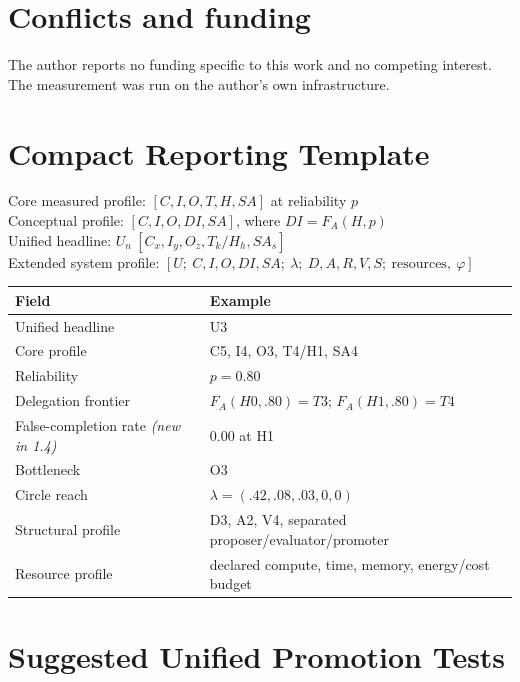 \documentclass[11pt]{article}
\theoremstyle{definition}
\newcommand{\FA}{\ensuremath{F_A(H,p)}}
\begin{document}
\section*{Conflicts and funding}

The author reports no funding specific to this work and no competing interest. The measurement was run on the author's own infrastructure.




\appendix

\section{Compact Reporting Template}

\begin{center}
Core measured profile: $[C, I, O, T, H, SA]$ at reliability $p$\\
Conceptual profile: $[C, I, O, DI, SA]$, where $DI = \FA{}$\\
Unified headline: $U_n\ [C_x, I_y, O_z, T_k/H_h, SA_s]$\\
Extended system profile: $[U;\ C,I,O,DI,SA;\ \lambda;\ D,A,R,V,S;\ \text{resources},\ \varphi]$
\end{center}

\begin{table}[h]
\centering\small
\begin{tabularx}{\textwidth}{@{}lY@{}}
\toprule
Field & Example \\
\midrule
Unified headline & U3 \\
Core profile & C5, I4, O3, T4/H1, SA4 \\
Reliability & $p = 0.80$ \\
Delegation frontier & $F_A(H0,.80)=T3$; $F_A(H1,.80)=T4$ \\
False-completion rate \emph{(new in 1.4)} & 0.00 at H1 \\
Bottleneck & O3 \\
Circle reach & $\lambda = (.42,.08,.03,0,0)$ \\
Structural profile & D3, A2, V4, separated proposer/evaluator/promoter \\
Resource profile & declared compute, time, memory, energy/cost budget \\
\bottomrule
\end{tabularx}
\end{table}

\section{Suggested Unified Promotion Tests}
\end{document}
